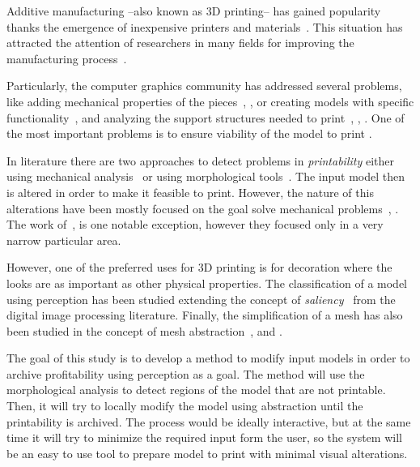 Additive manufacturing --also known as 3D printing-- has gained popularity thanks the emergence of inexpensive printers and materials~\cite{Oropallo2015}. This situation has attracted the attention of researchers in many fields for improving the manufacturing process~\cite{Gao2015}.

Particularly, the computer graphics community has addressed several problems, like adding mechanical properties of the pieces~\cite{Bacher2014}, \cite{Li2015}, \cite{Panetta2015} or creating models with specific functionality~\cite{Song2015}, \cite{Bacher2014} and analyzing the support structures needed to print~\cite{Vanek2014}, \cite{Dumas2014}, \cite{Hu2016}. One of the most important problems is to ensure viability of the model to print .

In literature there are two approaches to detect problems in \emph{printability} either using mechanical analysis~\cite{Stava2012} or using morphological tools~\cite{Telea2011}. The input model then is altered in order to make it feasible to print. However, the nature of this alterations have been mostly focused on the goal solve mechanical problems~\cite{Lu2014}, \cite{Zhou2013}. The work of~\cite{Echevarria2014}, is one notable exception, however they focused only in a very narrow particular area.

However, one of the preferred uses for 3D printing is for decoration where the looks are as important as other physical properties. The classification of a model using perception has been studied extending the concept of \emph{saliency}~\cite{Wang2015} from the digital image processing literature. Finally, the simplification of a mesh has also been studied in the concept of mesh abstraction~\cite{Mehra2009}, \cite{Yumer2012} and \cite{DeGoes2011}.

The goal of this study is to develop a method to modify input models in order to archive profitability using perception as a goal. The method will use the morphological analysis to detect regions of the model that are not printable. Then, it will try to locally modify the model using abstraction until the printability is archived. The process would be ideally interactive, but at the same time it will try to minimize the required input form the user, so the system will be an easy to use tool to prepare model to print with minimal visual alterations.
